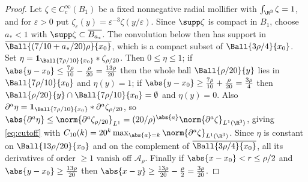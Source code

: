 \documentclass[11pt,reqno]{amsart}
\begin{document}
\begin{proof}
Let $\zeta\in C_{c}^{\infty}(B_{1})$ be a fixed nonnegative radial mollifier with
$\int_{\R^{3}}\zeta=1$, and for $\varepsilon>0$ put
$\zeta_{\varepsilon}(y)=\varepsilon^{-3}\zeta(y/\varepsilon)$.
Since $\supp\zeta$ is compact in $B_1$, choose $a_*<1$ with
$\supp\zeta\subset\overline{B_{a_*}}$. The convolution below then has
support in $\overline{\Ball{(7/10+a_*/20)\rho}{x_0}}$, which is a compact
subset of $\Ball{3\rho/4}{x_0}$. Set
$\eta=\mathbf{1}_{\Ball{7\rho/10}{x_{0}}}*\zeta_{\rho/20}$. Then
$0\le\eta\le1$; if $\abs{y-x_{0}}\le\tfrac{7\rho}{10}-\tfrac{\rho}{20}
=\tfrac{13\rho}{20}$ then the whole ball $\Ball{\rho/20}{y}$ lies in
$\Ball{7\rho/10}{x_{0}}$ and $\eta(y)=1$; if
$\abs{y-x_{0}}\ge\tfrac{7\rho}{10}+\tfrac{\rho}{20}=\tfrac{3\rho}{4}$ then
$\Ball{\rho/20}{y}\cap\Ball{7\rho/10}{x_{0}}=\emptyset$ and $\eta(y)=0$. Also
$\partial^{a}\eta=\mathbf{1}_{\Ball{7\rho/10}{x_{0}}}*\partial^{a}\zeta_{\rho/20}$,
so
$\abs{\partial^{a}\eta}\le\norm{\partial^{a}\zeta_{\rho/20}}_{L^{1}}
 =(20/\rho)^{\abs{a}}\norm{\partial^{a}\zeta}_{L^{1}(\R^{3})}$, giving
\eqref{eq:cutoff} with
$C_{10}(k)=20^{k}\max_{\abs{a}=k}\norm{\partial^{a}\zeta}_{L^{1}(\R^{3})}$. Since
$\eta$ is constant on $\Ball{13\rho/20}{x_{0}}$ and on the complement of
$\overline{\Ball{3\rho/4}{x_{0}}}$, all its derivatives of order $\ge1$ vanish
off $\mathcal{A}_{\rho}$. Finally if $\abs{x-x_{0}}<r\le\rho/2$ and
$\abs{y-x_{0}}\ge\tfrac{13\rho}{20}$ then
$\abs{x-y}\ge\tfrac{13\rho}{20}-\tfrac{\rho}{2}=\tfrac{3\rho}{20}$.
\end{proof}
\end{document}
